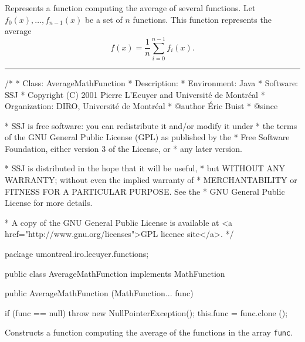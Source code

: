 
Represents a function computing the average of several functions.
Let $f_0(x), \ldots, f_{n-1}(x)$ be a set of $n$ functions.
This function represents the average \[f(x)=\frac1n\sum_{i=0}^{n-1} f_i(x).\]

\bigskip\hrule

\begin{code}
\begin{hide}
/*
 * Class:        AverageMathFunction
 * Description:  
 * Environment:  Java
 * Software:     SSJ 
 * Copyright (C) 2001  Pierre L'Ecuyer and Université de Montréal
 * Organization: DIRO, Université de Montréal
 * @author       Éric Buist
 * @since

 * SSJ is free software: you can redistribute it and/or modify it under
 * the terms of the GNU General Public License (GPL) as published by the
 * Free Software Foundation, either version 3 of the License, or
 * any later version.

 * SSJ is distributed in the hope that it will be useful,
 * but WITHOUT ANY WARRANTY; without even the implied warranty of
 * MERCHANTABILITY or FITNESS FOR A PARTICULAR PURPOSE.  See the
 * GNU General Public License for more details.

 * A copy of the GNU General Public License is available at
   <a href="http://www.gnu.org/licenses">GPL licence site</a>.
 */
\end{hide}
package umontreal.iro.lecuyer.functions;\begin{hide}

\end{hide}

public class AverageMathFunction implements MathFunction\begin{hide}

,
   MathFunctionWithFirstDerivative, MathFunctionWithDerivative,
   MathFunctionWithIntegral {
   private MathFunction[] func;
\end{hide}

   public AverageMathFunction (MathFunction... func)\begin{hide} {
      if (func == null)
         throw new NullPointerException();
      this.func = func.clone ();
   }\end{hide}
\end{code}
\begin{tabb}   Constructs a function computing the average
 of the functions in the array \texttt{func}.
\end{tabb}
